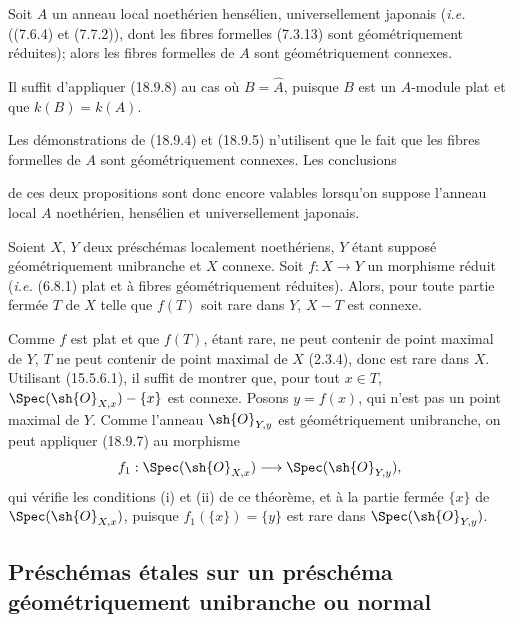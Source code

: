 \begin{corollary}[18.9.9]
\label{IV.18.9.9}
Soit $A$ un anneau local noethérien hensélien, universellement japonais (\emph{i.e.} ((7.6.4) et (7.7.2)), dont les fibres formelles (7.3.13) sont géométriquement réduites); alors les fibres formelles de $A$ sont géométriquement connexes.
\end{corollary}

Il suffit d'appliquer (18.9.8) au cas où $B=\widehat A$, puisque $B$ est un $A$-module plat et que $k(B)=k(A)$.

\begin{remark}[18.9.10]
\label{IV.18.9.10}
Les démonstrations de (18.9.4) et (18.9.5) n'utilisent que le fait que les fibres formelles de $A$ sont géométriquement connexes. Les conclusions


de ces deux propositions sont donc encore valables lorsqu'on suppose l'anneau local $A$ noethérien, hensélien et universellement japonais.
\end{remark}

\begin{corollary}[18.9.11]
\label{IV.18.9.11}
Soient $X$, $Y$ deux préschémas localement noethériens, $Y$ étant supposé géométriquement unibranche et $X$ connexe. Soit $f:X\to Y$ un morphisme réduit (\emph{i.e.} (6.8.1) plat et à fibres géométriquement réduites). Alors, pour toute partie fermée $T$ de $X$ telle que $f(T)$ soit rare dans $Y$, $X-T$ est connexe.
\end{corollary}

Comme $f$ est plat et que $f(T)$, étant rare, ne peut contenir de point maximal de $Y$, $T$ ne peut contenir de point maximal de $X$ (2.3.4), donc est rare dans $X$. Utilisant (15.5.6.1), il suffit de montrer que, pour tout $x\in T$, $\Spec(\sh{O}_{X,x})-\{x\}$ est connexe. Posons $y=f(x)$, qui n'est pas un point maximal de $Y$. Comme l'anneau $\sh{O}_{Y,y}$ est géométriquement unibranche, on peut appliquer (18.9.7) au morphisme
\[
  f_1:\Spec(\sh{O}_{X,x})\longrightarrow\Spec(\sh{O}_{Y,y}),
\]
qui vérifie les conditions (i) et (ii) de ce théorème, et à la partie fermée $\{x\}$ de $\Spec(\sh{O}_{X,x})$, puisque $f_1(\{x\})=\{y\}$ est rare dans $\Spec(\sh{O}_{Y,y})$.

\subsection{Préschémas étales sur un préschéma géométriquement unibranche ou normal}

